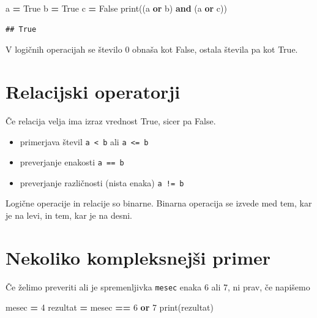 \documentclass[
]{report}
\newenvironment{Shaded}{\begin{snugshade}}{\end{snugshade}}
\newcommand{\BuiltInTok}[1]{#1}
\newcommand{\DecValTok}[1]{\textcolor[rgb]{0.00,0.00,0.81}{#1}}
\newcommand{\KeywordTok}[1]{\textcolor[rgb]{0.13,0.29,0.53}{\textbf{#1}}}
\newcommand{\NormalTok}[1]{#1}
\newcommand{\OperatorTok}[1]{\textcolor[rgb]{0.81,0.36,0.00}{\textbf{#1}}}
\newcommand{\VariableTok}[1]{\textcolor[rgb]{0.00,0.00,0.00}{#1}}
\providecommand{\tightlist}{%
  \setlength{\itemsep}{0pt}\setlength{\parskip}{0pt}}
\begin{document}
\begin{Shaded}
\begin{Highlighting}[]
\NormalTok{a }\OperatorTok{=} \VariableTok{True}
\NormalTok{b }\OperatorTok{=} \VariableTok{True}
\NormalTok{c }\OperatorTok{=} \VariableTok{False}
\BuiltInTok{print}\NormalTok{((a }\KeywordTok{or}\NormalTok{ b) }\KeywordTok{and}\NormalTok{ (a }\KeywordTok{or}\NormalTok{ c))}
\end{Highlighting}
\end{Shaded}

\begin{verbatim}
## True
\end{verbatim}

V logičnih operacijah se število 0 obnaša kot False, ostala števila pa kot True.

\hypertarget{relacijski-operatorji}{%
\section{Relacijski operatorji}\label{relacijski-operatorji}}

Če relacija velja ima izraz vrednost True, sicer pa False.

\begin{itemize}
\tightlist
\item
  primerjava števil \texttt{a\ \textless{}\ b} ali \texttt{a\ \textless{}=\ b}
\item
  preverjanje enakosti \texttt{a\ ==\ b}
\item
  preverjanje različnosti (nista enaka) \texttt{a\ !=\ b}
\end{itemize}

Logične operacije in relacije so binarne. Binarna operacija se izvede med tem,
kar je na levi, in tem, kar je na desni.

\hypertarget{nekoliko-kompleksnejux161i-primer}{%
\section{Nekoliko kompleksnejši primer}\label{nekoliko-kompleksnejux161i-primer}}

Če želimo preveriti ali je spremenljivka \texttt{mesec} enaka 6 ali 7, ni prav, če napišemo

\begin{Shaded}
\begin{Highlighting}[]
\NormalTok{mesec }\OperatorTok{=} \DecValTok{4}
\NormalTok{rezultat }\OperatorTok{=}\NormalTok{ mesec }\OperatorTok{==} \DecValTok{6} \KeywordTok{or} \DecValTok{7}
\BuiltInTok{print}\NormalTok{(rezultat)}
\end{Highlighting}
\end{Shaded}
\end{document}
